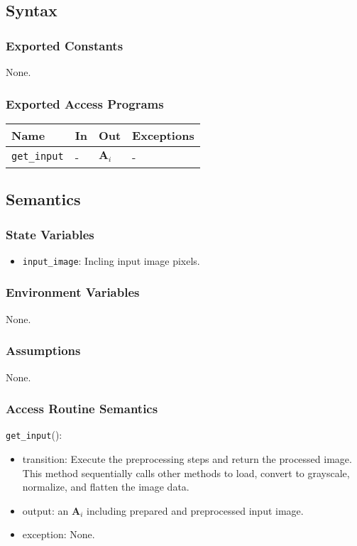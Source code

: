 \documentclass[12pt, titlepage]{article}
\def\code#1{\texttt{#1}}
\begin{document}
\subsection{Syntax}
\subsubsection{Exported Constants}
None.

\subsubsection{Exported Access Programs}

\begin{center}
\begin{tabular}{p{3.5cm} p{4cm} p{4cm} p{2cm}}
\hline
\textbf{Name} & \textbf{In} & \textbf{Out} & \textbf{Exceptions} \\
\hline
\code{get\_input} & - & $\mathbf{A}_{i}$ & - \\
\hline
\end{tabular}
\end{center}

\subsection{Semantics}

\subsubsection{State Variables}
\begin{itemize}
  \item \code{input\_image}: Incling input image pixels.
\end{itemize}

\subsubsection{Environment Variables}
None.

\subsubsection{Assumptions}
None.

\subsubsection{Access Routine Semantics}

\noindent \code{get\_input}():
\begin{itemize}
  \item transition: Execute the preprocessing steps and return the processed image.
  This method sequentially calls other methods to load, convert to grayscale, 
  normalize, and flatten the image data.
  \item output: an $\mathbf{A}_{i}$ including prepared and preprocessed input image.
  \item exception: None.
\end{itemize}
\end{document}
